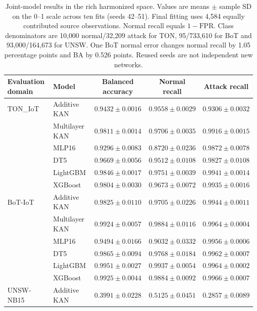 
\begin{table}[p]
\centering
\caption{Joint-model results in the rich harmonized space. Values are means $\pm$ sample SD on the 0--1 scale across ten fits (seeds 42--51). Final fitting uses 4,584 equally contributed source observations. Normal recall equals $1-\mathrm{FPR}$. Class denominators are 10,000 normal/32,209 attack for TON, 95/733,610 for BoT and 93,000/164,673 for UNSW. One BoT normal error changes normal recall by 1.05 percentage points and BA by 0.526 points. Reused seeds are not independent new networks.}
\label{tab:supp-joint-recalls}
\footnotesize
\setlength{\tabcolsep}{6pt}
\begin{tabular}{llccc}
\toprule
Evaluation domain & Model & Balanced accuracy & Normal recall & Attack recall \\
\midrule
TON\_IoT & Additive KAN & $0.9432 \pm 0.0016$ & $0.9558 \pm 0.0029$ & $0.9306 \pm 0.0032$ \\
 & Multilayer KAN & $0.9811 \pm 0.0014$ & $0.9706 \pm 0.0035$ & $0.9916 \pm 0.0015$ \\
 & MLP16 & $0.9296 \pm 0.0083$ & $0.8720 \pm 0.0236$ & $0.9872 \pm 0.0078$ \\
 & DT5 & $0.9669 \pm 0.0056$ & $0.9512 \pm 0.0108$ & $0.9827 \pm 0.0108$ \\
 & LightGBM & $0.9846 \pm 0.0017$ & $0.9751 \pm 0.0039$ & $0.9941 \pm 0.0014$ \\
 & XGBoost & $0.9804 \pm 0.0030$ & $0.9673 \pm 0.0072$ & $0.9935 \pm 0.0016$ \\
\midrule
BoT-IoT & Additive KAN & $0.9825 \pm 0.0110$ & $0.9705 \pm 0.0226$ & $0.9944 \pm 0.0011$ \\
 & Multilayer KAN & $0.9924 \pm 0.0057$ & $0.9884 \pm 0.0116$ & $0.9964 \pm 0.0004$ \\
 & MLP16 & $0.9494 \pm 0.0166$ & $0.9032 \pm 0.0332$ & $0.9956 \pm 0.0006$ \\
 & DT5 & $0.9865 \pm 0.0094$ & $0.9768 \pm 0.0184$ & $0.9962 \pm 0.0007$ \\
 & LightGBM & $0.9951 \pm 0.0027$ & $0.9937 \pm 0.0054$ & $0.9964 \pm 0.0002$ \\
 & XGBoost & $0.9925 \pm 0.0044$ & $0.9884 \pm 0.0092$ & $0.9966 \pm 0.0007$ \\
\midrule
UNSW-NB15 & Additive KAN & $0.3991 \pm 0.0228$ & $0.5125 \pm 0.0451$ & $0.2857 \pm 0.0089$ \\

\end{tabular}
\end{table}
